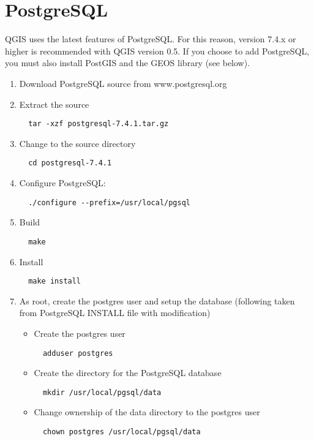 \documentclass[a4paper,10pt]{article}
\begin{document}
  \section{PostgreSQL}
  QGIS uses the latest features of PostgreSQL. For this reason, version 7.4.x or higher is recommended with QGIS version 0.5. If you choose to add PostgreSQL, you must also install PostGIS and the GEOS library (see below). 
  \begin{enumerate}
  \item Download PostgreSQL source from www.postgresql.org 
  \item Extract the source 
  \begin{verbatim}
  tar -xzf postgresql-7.4.1.tar.gz
  \end{verbatim}

  \item Change to the source directory 
  \begin{verbatim}
  cd postgresql-7.4.1
  \end{verbatim}

  \item Configure PostgreSQL:
  \begin{verbatim}
  ./configure --prefix=/usr/local/pgsql 
  \end{verbatim}

  \item Build
  \begin{verbatim}
  make
  \end{verbatim}

  \item Install
  \begin{verbatim}
  make install
  \end{verbatim}

\item As root, create the postgres user and setup the database (following taken from PostgreSQL INSTALL file with modification)
  \begin{itemize} 
  \item Create the postgres user 
  \begin{verbatim}
  adduser postgres
  \end{verbatim}

  \item Create the directory for the PostgreSQL database 
  \begin{verbatim}
  mkdir /usr/local/pgsql/data
  \end{verbatim}

  \item Change ownership of the data directory to the postgres user
  \begin{verbatim}
  chown postgres /usr/local/pgsql/data
  \end{verbatim}


\end{itemize}
\end{enumerate}
\end{document}
